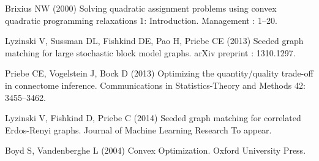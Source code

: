\documentclass[10pt]{article}
\begin{document}
\begin{thebibliography}{10}
Brixius NW (2000) Solving quadratic assignment problems using convex quadratic
  programming relaxations 1: {I}ntroduction.
\newblock Management : 1--20.

Lyzinski V, Sussman DL, Fishkind DE, Pao H, Priebe CE (2013) {Seeded graph
  matching for large stochastic block model graphs}.
\newblock arXiv preprint : 1310.1297.

Priebe CE, Vogelstein J, Bock D (2013) Optimizing the quantity/quality
  trade-off in connectome inference.
\newblock Communications in Statistics-Theory and Methods 42: 3455--3462.

Lyzinski V, Fishkind D, Priebe C (2014) Seeded graph matching for correlated
  {E}rdos-{R}enyi graphs.
\newblock Journal of Machine Learning Research To appear.

Boyd S, Vandenberghe L (2004) {Convex Optimization}.
\newblock Oxford University Press.

\end{thebibliography}
\end{document}
